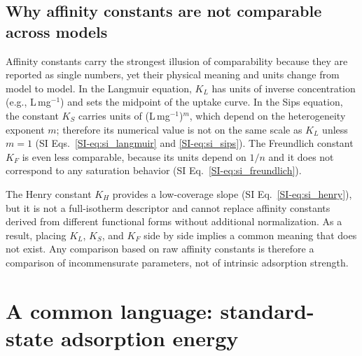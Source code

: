 \documentclass[journal=jacsat,manuscript=article]{achemso}
\begin{document}
\subsection{Why affinity constants are not comparable across models}
\label{sec:kaff_problem}


Affinity constants carry the strongest illusion of comparability because they
are reported as single numbers, yet their physical meaning and units change
from model to model. In the Langmuir equation, $K_L$ has units of inverse
concentration (e.g., L\,mg$^{-1}$) and sets the midpoint of the uptake curve.
In the Sips equation, the constant $K_S$ carries units of
(L\,mg$^{-1}$)$^{m}$, which depend on the heterogeneity exponent $m$; therefore
its numerical value is not on the same scale as $K_L$ unless $m = 1$
(SI Eqs.~\eqref{SI-eq:si_langmuir} and \eqref{SI-eq:si_sips}). The Freundlich
constant $K_F$ is even less comparable, because its units depend on $1/n$ and it
does not correspond to any saturation behavior (SI
Eq.~\eqref{SI-eq:si_freundlich}).

The Henry constant $K_H$ provides a low-coverage slope (SI
Eq.~\eqref{SI-eq:si_henry}), but it is not a
full-isotherm descriptor and cannot replace affinity constants derived from
different functional forms without additional normalization. As a result,
placing $K_L$, $K_S$, and $K_F$ side by side implies a common meaning that does
not exist. Any comparison based on raw affinity constants is therefore a
comparison of incommensurate parameters, not of intrinsic adsorption strength.

	\section{A common language: standard-state adsorption energy}
	\label{sec:proposal}
\end{document}
